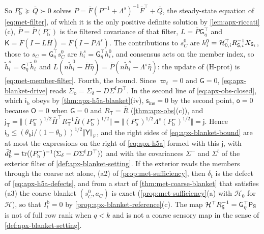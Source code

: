 \begin{remark}
So $P^-_{\mathrm b}\succeq\bar Q\succ0$ solves $P=\bar F(P^{-1}+\Lambda^s)^{-1}\bar F^\top+\bar Q$, the steady-state equation of \eqref{eq:met-filter}, of which it is the only positive definite solution by \cref{lem:apx-riccati}(c), $\bar P=\bar P(P^-_{\mathrm b})$ is the filtered covariance of that filter, $L=\bar P\mathsf G_\eta^\top$ and $\mathsf K=\bar F(I-L\bar H)=\bar F(I-\bar P\Lambda^s)$. The contributions to $s^0_C$ are $h^0_i=\mathcal H_{0,i}^\top R_{\mathsf{S},i}^{-1}X_{\mathsf{S}_i}$, those to $s_C=\mathsf G_\eta^\top s^0_C$ are $h^s_i=\mathsf G_\eta^\top h^0_i$, and consensus acts on the member index, so $\tilde h^s_i=\mathsf G_\eta^\top\tilde h^0_i$ and $L(n\tilde h^0_i-\bar H\hat\eta)=\bar P(n\tilde h^s_i-\Lambda^s\hat\eta)$: the update of (H-prot) is \eqref{eq:met-member-filter}. Fourth, the bound. Since $\varpi_t=0$ and $\mathsf G=0$, \eqref{eq:apx-blanket-drive} reads $\Sigma_{\mathrm o}=\Sigma_\delta-D\Sigma^{\mathrm f}D^\top$. In the second line of \eqref{eq:apx-obs-closed}, which $\mathsf i_{\mathrm b}$ obeys by \cref{thm:apx-h5a-blanket}(iv), $\mathsf s_{\mathrm{ins}}=0$ by the second point, $\mathsf o=0$ because $\mathsf O=0$ when $\mathsf G=0$ and $R_{\mathsf T}=\bar R$ (\cref{thm:apx-obs}(c)), and $\mathsf j_{\mathsf T}=\Vert(P^-_{\mathrm b})^{1/2}\bar H^\top R_{\mathsf T}^{-1}\bar H(P^-_{\mathrm b})^{1/2}\Vert=\Vert(P^-_{\mathrm b})^{1/2}\Lambda^s(P^-_{\mathrm b})^{1/2}\Vert=\mathsf j$. Hence $\mathsf i_{\mathrm b}\le(\theta_{\mathrm b}\mathsf j/(1-\theta_{\mathrm b}))^{1/2}\Vert\mathsf Y\Vert_{\mathrm F}$, and the right sides of \eqref{eq:apx-blanket-bound} are at most the expressions on the right of \eqref{eq:apx-h5a} formed with this $\mathsf j$, with $\bar d_{\mathrm b}^2=\operatorname{tr}((P^-_{\mathrm b})^{-1}(\Sigma_\delta-D\Sigma^{\mathrm f}D^\top))$ and with the covariances $\Sigma^-$ and $\Sigma^{\mathrm f}$ of the exterior filter of \cref{def:apx-blanket-setting}. If the exterior reads the members through the coarse act alone, (a2) of \cref{prop:met-sufficiency}, then $\delta_t$ is the defect of \eqref{eq:apx-h5a-defects}, and from a start of \cref{thm:met-coarse-blanket} that satisfies (a3) the coarse blanket $(s^0_C,a_C)$ is exact (\cref{prop:met-sufficiency}(a) with $\mathcal H_0$ for $\mathcal H$), so that $I^{\mathrm b}_t=0$ by \cref{prop:apx-blanket-reference}(c). The map $\mathcal H^\top R_{\mathsf{S}}^{-1}=\mathsf G_\eta^\top\mathsf P_{\mathrm S}$ is not of full row rank when $q<k$ and is not a coarse sensory map in the sense of \cref{def:apx-blanket-setting}.
\end{remark}
